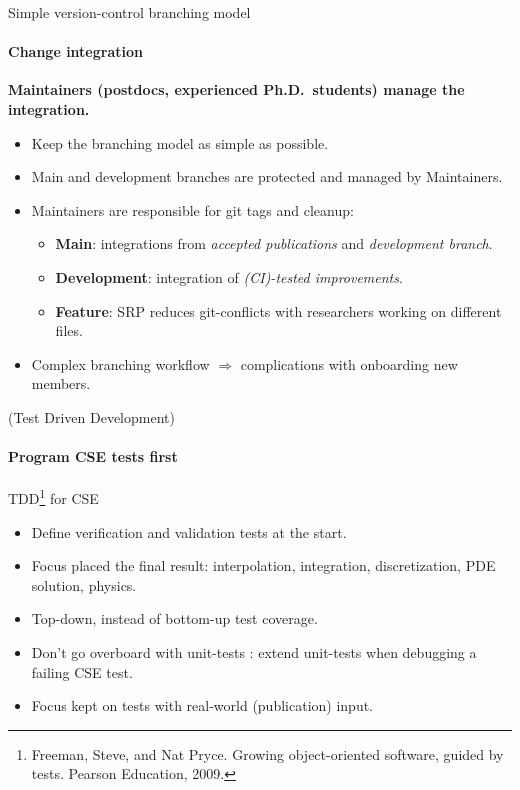 \documentclass[
	aspectratio=169,%
	color={accentcolor=2d},
	logo=true,%
	colorframetitle=true,%
	]{tudabeamer}
\begin{document}
\begin{frame}{Simple version-control branching model} 
    \framesubtitle{Change integration}

        \vfill

        \textbf{Maintainers (postdocs, experienced Ph.D.\ students) manage the integration.} 

	\begin{itemize}
            \item Keep the branching model as simple as possible.  
            \item Main and development branches are protected and managed by Maintainers. 
            \item Maintainers are responsible for git tags and cleanup: 
            \begin{itemize}
                    \item \textbf{Main}: integrations from \emph{accepted publications} and \emph{development branch}. 
                    \item \textbf{Development}: integration of \emph{(CI)-tested improvements}. 
                    \item \textbf{Feature}: SRP reduces git-conflicts with researchers working on different files.
            \end{itemize}
            \item Complex branching workflow $\Rightarrow$ complications with onboarding new members.
	\end{itemize}

\end{frame}

\begin{frame}{(Test Driven Development)} 
    \framesubtitle{Program CSE tests first}
        \vfill


        TDD\footnote{Freeman, Steve, and Nat Pryce. Growing object-oriented software, guided by tests. Pearson Education, 2009.} for CSE
        \begin{itemize}
            \item Define verification and validation tests at the start.
            \item Focus placed the final result: interpolation, integration, discretization, PDE solution, physics. 
            \item Top-down, instead of bottom-up test coverage.
            \item Don't go overboard with unit-tests \faGraduationCap: extend unit-tests when debugging a failing CSE test.  
            \item Focus kept on tests with real-world (publication) input. 
        \end{itemize}

\end{frame}
\end{document}
